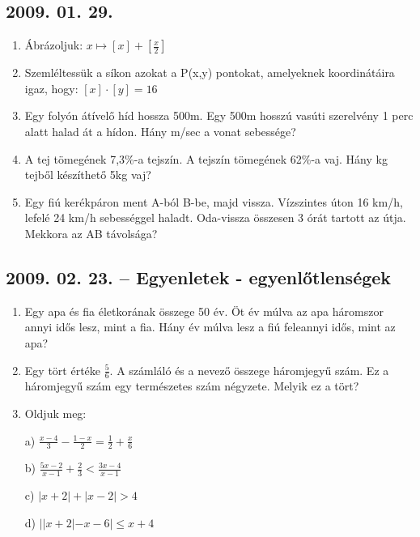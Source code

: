 \documentclass{article}
\begin{document}
\subsection*{2009. 01. 29.}
 
\begin{enumerate}
 
\item Ábrázoljuk: $x \mapsto [x]+[\displaystyle{\frac{x}{2}}]$
 
\item Szemléltessük a síkon azokat a P(x,y) pontokat, amelyeknek koordinátáira igaz, hogy: $[x]\cdot [y]=16$
 
\item Egy folyón átívelő híd hossza 500m. Egy 500m hosszú vasúti szerelvény 1 perc alatt halad át a hídon. Hány m/sec a vonat sebessége?
 
\item A tej tömegének 7,3\%-a tejszín. A tejszín tömegének 62\%-a vaj. Hány kg tejből készíthető 5kg vaj?
 
\item Egy fiú kerékpáron ment A-ból B-be, majd vissza. Vízszintes úton 16 km/h, lefelé 24 km/h sebességgel haladt. Oda-vissza összesen 3 órát tartott az útja. Mekkora az AB távolsága?
 
\end{enumerate}
 
\subsection*{2009. 02. 23. -- Egyenletek - egyenlőtlenségek}
 
\begin{enumerate}
 
\item Egy apa és fia életkorának összege 50 év. Öt év múlva az apa háromszor annyi idős lesz, mint a fia. Hány év múlva lesz a fiú feleannyi idős, mint az apa?
 
\item Egy tört értéke $\frac{5}{6}$. A számláló és a nevező összege háromjegyű szám. Ez a háromjegyű szám egy természetes szám négyzete. Melyik ez a tört?
 
\item Oldjuk meg:
 
a) $\displaystyle{\frac{x-4}{3}}-\displaystyle{\frac{1-x}{2}} = \displaystyle{\frac{1}{2}}+\displaystyle{\frac{x}{6}}$
 
b) $\displaystyle{\frac{5x-2}{x-1}}+\displaystyle{\frac{2}{3}}<\displaystyle{\frac{3x-4}{x-1}}$
 
c) $|x+2|+|x-2|>4$
 
d) $||x+2|-x-6|\le x+4$
 
\end{enumerate}
 
\end{document}
